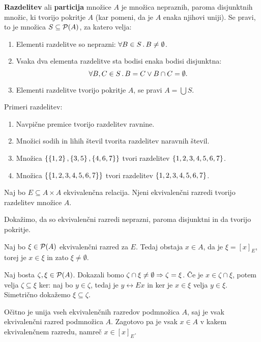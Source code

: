 \begin{definicija}
  \textbf{Razdelitev} ali \textbf{particija} množice $A$ je množica nepraznih, paroma
  disjunktnih množic, ki tvorijo pokritje $A$ (kar pomeni, da je $A$ enaka njihovi uniji). Se
  pravi, to je množica $S \subseteq \mathcal{P}(A)$, za katero velja:
  \begin{enumerate}
  \item Elementi razdelitve so neprazni: $\forall B \in S \,.\, B \neq \emptyset$.
  \item Vsaka dva elementa razdelitve sta bodisi enaka bodisi disjunktna:
    \begin{equation*}
      \forall B, C \in S \,.\, B = C \lor B \cap C = \emptyset.
    \end{equation*}
  \item Elementi razdelitve tvorijo pokritje $A$, se pravi $A = \bigcup S$.
  \end{enumerate}
\end{definicija}

\begin{zgled}
  Primeri razdelitev:
  \begin{enumerate}
  \item Navpične premice tvorijo razdelitev ravnine.
  \item Množici sodih in lihih števil tvorita razdelitev naravnih števil.
  \item Množica $\left\{\left\{1,2\right\}, \left\{3,5\right\}, \left\{4,6,7\right\}\right\}$ tvori razdelitev $\left\{1,2,3,4,5,6,7\right\}$.
  \item Množica $\left\{\left\{1,2,3,4,5,6,7\right\}\right\}$ tvori razdelitev $\left\{1,2,3,4,5,6,7\right\}$.
  \end{enumerate}
\end{zgled}

\begin{izrek}
  Naj bo $E \subseteq A \times A$ ekvivalenčna relacija. Njeni ekvivalenčni razredi tvorijo
  razdelitev množice $A$.
\end{izrek}

\begin{dokaz}
  Dokažimo, da so ekvivalenčni razredi neprazni, paroma disjunktni in da tvorijo pokritje.

  Naj bo $\xi \in \mathcal{P}(A)$ ekvivalenčni razred za $E$. Tedaj obstaja $x \in A$, da je $\xi = [x]_E$,
  torej je $x \in \xi$ in zato $\xi \neq \emptyset$.

  Naj bosta $\zeta, \xi \in \mathcal{P}(A)$. Dokazali bomo $\zeta \cap \xi \neq \emptyset \Rightarrow \zeta = \xi$. Če je $x \in \zeta \cap \xi$, potem velja $\zeta \subseteq \xi$ ker: naj bo $y \in \zeta$, tedaj je $y \rel{E} x$ in ker je $x \in \xi$ velja $y \in \xi$. Simetrično dokažemo $\xi \subseteq \zeta$.

  Očitno je unija vseh ekvivalenčnih razredov podmnožica $A$, saj je vsak ekvivalenčni razred podmnožica $A$. Zagotovo
  pa je vsak $x \in A$ v kakem ekvivalenčnem razredu, namreč $x \in [x]_E$.
\end{dokaz}

